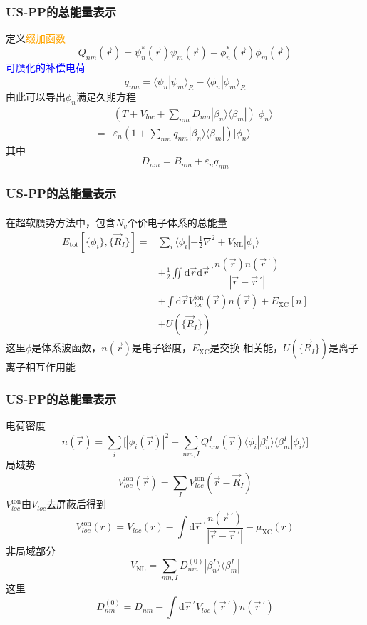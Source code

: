 \documentclass[cjk,slidestop,compress,mathserif,blue]{beamer}
\newcommand{\upcite}[1]{\hspace{0ex}\textsuperscript{\cite{#1}}} %
\begin{document}
\frame
{
	\frametitle{\textrm{US-PP}的总能量表示}
	定义\textcolor{orange}{缀加函数}$$Q_{nm}(\vec r)=\psi_n^{\ast}(\vec r)\psi_m(\vec r)-\phi_n^{\ast}(\vec r)\phi_m(\vec r)$$
	\textcolor{blue}{可赝化的补偿电荷}$$q_{nm}=\langle\psi_n|\psi_m\rangle_R-\langle\phi_n|\phi_m\rangle_R$$
	由此可以导出$\phi_n$满足久期方程
	\begin{displaymath}
		\begin{aligned}
			&\left(T+V_{loc}+\sum_{nm}D_{nm}|\beta_n\rangle\langle\beta_m|\right)|\phi_n\rangle\\
			=&\varepsilon_n\left(1+\sum_{nm}q_{nm}|\beta_n\rangle\langle\beta_m|\right)|\phi_n\rangle
		\end{aligned}
	\end{displaymath}
	其中$$D_{nm}=B_{nm}+\varepsilon_nq_{nm}$$
}

\frame
{
	\frametitle{\textrm{US-PP}的总能量表示}
	在超软赝势方法中，包含$N_v$个价电子体系的总能量\upcite{PRB47-10142_1993}
	\begin{displaymath}
		\begin{aligned}
			E_{\mathrm{tot}}[\{\phi_i\},\{\vec R_I\}]=&\sum_i\langle\phi_i|-\frac12\nabla^2+V_{\mathrm{NL}}|\phi_i\rangle\\
			&+\frac12\iint\mathrm{d}\vec r\mathrm{d}\vec r\,^{\prime}\dfrac{n(\vec r)n(\vec r\,^{\prime})}{|\vec r-\vec r\,^{\prime}|}\\
			&+\int\mathrm{d}\vec r V_{loc}^{\mathrm{ion}}(\vec r)n(\vec r)+E_{\mathrm{XC}}[n]\\
			&+U(\{\vec R_I\})
		\end{aligned}
	\end{displaymath}
	这里$\phi$是体系波函数，$n(\vec r)$是电子密度，$E_{\mathrm{XC}}$是交换-相关能，$U(\{\vec R_I\})$是离子-离子相互作用能
}

\frame
{
	\frametitle{\textrm{US-PP}的总能量表示}
	电荷密度$$n(\vec r)=\sum_i\big[|\phi_i(\vec r)|^2+\sum_{nm,I}Q_{nm}^I(\vec r)\langle\phi_i|\beta_n^I\rangle\langle\beta_m^I|\phi_i\rangle\big]$$
	局域势$$V_{loc}^{\mathrm{ion}}(\vec r)=\sum_IV_{loc}^{\mathrm{ion}}(\vec r-\vec R_I)$$
	$V_{loc}^{\mathrm{ion}}$由$V_{loc}$去屏蔽后得到$$V_{loc}^{\mathrm{ion}}(r)=V_{loc}(r)-\int\mathrm{d}\vec r\,^{\prime}\dfrac{n(\vec r\,^{\prime})}{|\vec r-\vec r\,^{\prime}|}-\mu_{\mathrm{XC}}(r)$$
	非局域部分$$V_{\mathrm{NL}}=\sum_{nm,I}D_{nm}^{(0)}|\beta_n^I\rangle\langle\beta_m^I|$$
	这里$$D_{nm}^{(0)}=D_{nm}-\int\mathrm{d}\vec r\,^{\prime}V_{loc}(\vec r\,^{\prime})n(\vec r\,^{\prime})$$
}
\end{document}
